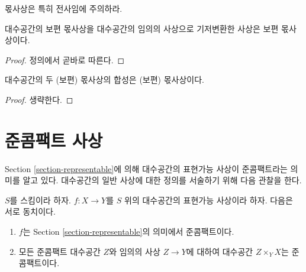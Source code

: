 \noindent
몫사상은 특히 전사임에 주의하라.

\begin{lemma}
\label{lemma-base-change-universally-submersive}
대수공간의 보편 몫사상을 대수공간의 임의의 사상으로 기저변환한
사상은 보편 몫사상이다.
\end{lemma}

\begin{proof}
정의에서 곧바로 따른다.
\end{proof}

\begin{lemma}
\label{lemma-composition-universally-submersive}
대수공간의 두 (보편) 몫사상의 합성은 (보편) 몫사상이다.
\end{lemma}

\begin{proof}
생략한다.
\end{proof}













\section{준콤팩트 사상}
\label{section-quasi-compact}

\noindent
Section \ref{section-representable}에 의해 대수공간의 표현가능 사상이
준콤팩트라는 의미를 알고 있다. 대수공간의 일반 사상에 대한 정의를
서술하기 위해 다음 관찰을 한다.

\begin{lemma}
\label{lemma-characterize-representable-quasi-compact}
$S$를 스킴이라 하자.
$f : X \to Y$를 $S$ 위의 대수공간의 표현가능 사상이라 하자.
다음은 서로 동치이다.
\begin{enumerate}
\item $f$는 Section \ref{section-representable}의 의미에서 준콤팩트이다.
\item 모든 준콤팩트 대수공간 $Z$와 임의의 사상 $Z \to Y$에 대하여
대수공간 $Z \times_Y X$는 준콤팩트이다.
\end{enumerate}
\end{lemma}


